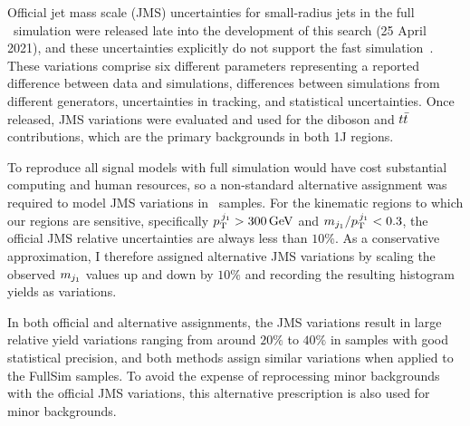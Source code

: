 Official jet mass scale (JMS) uncertainties for small-radius jets in the full
\atlas\ simulation were released late into the development of this search
(25 April 2021), and these uncertainties explicitly do not support the
fast simulation~\cite{atlas_twiki_smallrjms}.
These variations comprise six different parameters representing a reported
difference between data and simulations, differences between simulations from
different generators, uncertainties in tracking, and statistical uncertainties.
Once released, JMS variations were evaluated and used for the diboson and
$\ttbar$ contributions, which are the primary backgrounds in both 1J regions.

To reproduce all signal models with full simulation would have cost substantial
computing and human resources, so a non-standard alternative assignment was
required to model JMS variations in \afii\ samples.
For the kinematic regions to which our regions are sensitive, specifically
$\ptjone > 300\,\eV[G]$ and $\mjetone/\ptjone < 0.3$, the official
JMS relative uncertainties are always less than $10\%$.
As a conservative approximation, I therefore assigned alternative JMS
variations by scaling the observed $\mjetone$ values up and down by $10\%$
and recording the resulting histogram yields as variations.

In both official and alternative assignments, the JMS variations result in
large relative yield variations ranging from around $20\%$ to $40\%$ in samples
with good statistical precision, and both methods assign similar variations
when applied to the FullSim samples.
To avoid the expense of reprocessing minor backgrounds with the official JMS
variations, this alternative prescription is also used for minor backgrounds.


